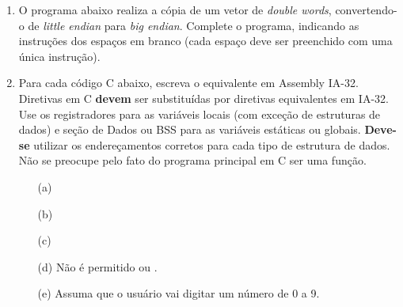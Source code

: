 \begin{enumerate}[resume]
    \item
    O programa abaixo realiza a cópia de um vetor de \textit{double words}, 
    convertendo-o de \textit{little endian} para \textit{big endian}.
    Complete o programa, indicando as instruções dos espaços em branco 
    (cada espaço deve ser preenchido com uma única instrução).


    \item
    Para cada código C abaixo, escreva o equivalente em Assembly IA-32.
    Diretivas em C \textbf{devem} ser substituídas por diretivas equivalentes em IA-32.
    Use os registradores para as variáveis locais (com exceção de estruturas de dados)
    e seção de Dados ou BSS para as variáveis estáticas ou globais.
    \textbf{Deve-se} utilizar os endereçamentos corretos 
    para cada tipo de estrutura de dados.
    Não se preocupe pelo fato do programa principal em C ser uma função.
    \begin{itemize}
        \item [(a)] 
        \item [(b)] 
        \item [(c)] 
        \item [(d)] Não é permitido  ou .
        \item [(e)] Assuma que o usuário vai digitar um número de 0 a 9.
    \end{itemize}
\end{enumerate}
